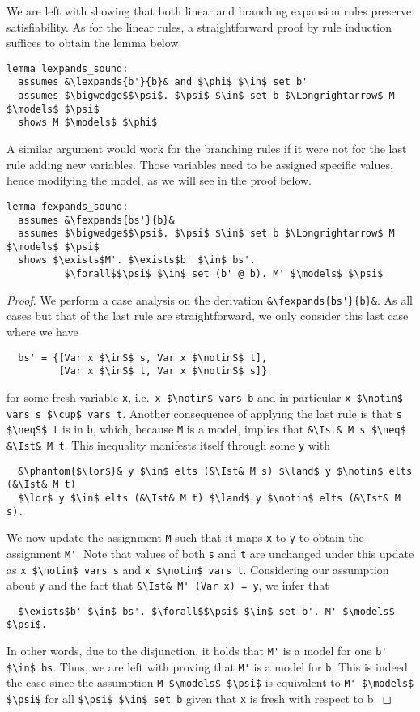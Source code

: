 \documentclass[sigplan,10pt,anonymous,review]{acmart}
\newcommand{\lefttrianglebar}{\mathrel{\tikz[baseline]{\draw (1ex, 0.75ex) -- (0, 1.25ex) -- (0, 0.25ex) -- cycle; \draw (0, 0.75ex) -- (1ex, 0.75ex);}}}
\newcommand{\lefttriangle}{\mathrel{\tikz[baseline]{\draw (1ex, 0.75ex) -- (0, 1.25ex) -- (0, 0.25ex) -- cycle;}}}
\newcommand{\lexpands}[2]{#1 $\lefttriangle$ #2}
\newcommand{\fexpands}[2]{#1 $\lefttrianglebar$ #2}
\newcommand{\inS}{\in_\text{s}}
\newcommand{\notinS}{\notin_\text{s}}
\newcommand{\neqS}{\neq_\text{s}}
\newcommand{\Ist}{I$_\text{st}$}
\begin{document}
\noindent We are left with showing that both linear and branching expansion rules preserve satisfiability.
As for the linear rules, a straightforward proof by rule induction suffices to obtain the lemma below.
\begin{lstlisting}
lemma lexpands_sound:
  assumes &\lexpands{b'}{b}& and $\phi$ $\in$ set b'
  assumes $\bigwedge$$\psi$. $\psi$ $\in$ set b $\Longrightarrow$ M $\models$ $\psi$
  shows M $\models$ $\phi$
\end{lstlisting}
A similar argument would work for the branching rules if it were not for the last rule adding new variables.
Those variables need to be assigned specific values, hence modifying the model, as we will see in the proof below.
\begin{lstlisting}[belowskip=0pt]
lemma fexpands_sound:
  assumes &\fexpands{bs'}{b}&
  assumes $\bigwedge$$\psi$. $\psi$ $\in$ set b $\Longrightarrow$ M $\models$ $\psi$
  shows $\exists$M'. $\exists$b' $\in$ bs'.
          $\forall$$\psi$ $\in$ set (b' @ b). M' $\models$ $\psi$
\end{lstlisting}
\begin{proof}
  We perform a case analysis on the derivation \lstinline!&\fexpands{bs'}{b}&!.
  As all cases but that of the last rule are straightforward, we only consider this last case where we have 
\begin{lstlisting}
  bs' = {[Var x $\inS$ s, Var x $\notinS$ t],
         [Var x $\inS$ t, Var x $\notinS$ s]}
\end{lstlisting}
  for some fresh variable \lstinline!x!, i.e.\ \lstinline!x $\notin$ vars b! and in particular \lstinline!x $\notin$ vars s $\cup$ vars t!.
  Another consequence of applying the last rule is that \lstinline!s $\neqS$ t! is in \lstinline!b!, which, because \lstinline!M! is a model, implies that \lstinline!&\Ist& M s $\neq$ &\Ist& M t!.
  This inequality manifests itself through some \lstinline!y! with
\begin{lstlisting}
  &\phantom{$\lor$}& y $\in$ elts (&\Ist& M s) $\land$ y $\notin$ elts (&\Ist& M t)
  $\lor$ y $\in$ elts (&\Ist& M t) $\land$ y $\notin$ elts (&\Ist& M s).
\end{lstlisting}
  We now update the assignment \lstinline!M! such that it maps \lstinline!x! to \lstinline!y! to obtain the assignment \lstinline!M'!.
  Note that values of both \lstinline!s! and \lstinline!t! are unchanged under this update as \lstinline!x $\notin$ vars s! and \lstinline!x $\notin$ vars t!.
  Considering our assumption about \lstinline!y! and the fact that \lstinline!&\Ist& M' (Var x) = y!, we infer that
\begin{lstlisting}
  $\exists$b' $\in$ bs'. $\forall$$\psi$ $\in$ set b'. M' $\models$ $\psi$.
\end{lstlisting}
  In other words, due to the disjunction, it holds that \lstinline!M'! is a model for one \lstinline!b' $\in$ bs!.
  Thus, we are left with proving that \lstinline!M'! is a model for \lstinline!b!.
  This is indeed the case since the assumption \lstinline!M $\models$ $\psi$! is equivalent to \lstinline!M' $\models$ $\psi$! for all \lstinline!$\psi$ $\in$ set b! given that \lstinline!x! is fresh with respect to b.
\end{proof}
\end{document}
